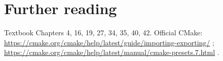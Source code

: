 \documentclass[11pt,letterpaper,oneside]{report}
\begin{document}
\chapter{Further reading}\label{further-reading}

Textbook Chapters 4, 16, 19, 27, 34, 35, 40, 42. Official CMake:
\url{https://cmake.org/cmake/help/latest/guide/importing-exporting/} ;
\url{https://cmake.org/cmake/help/latest/manual/cmake-presets.7.html} .
\end{document}
